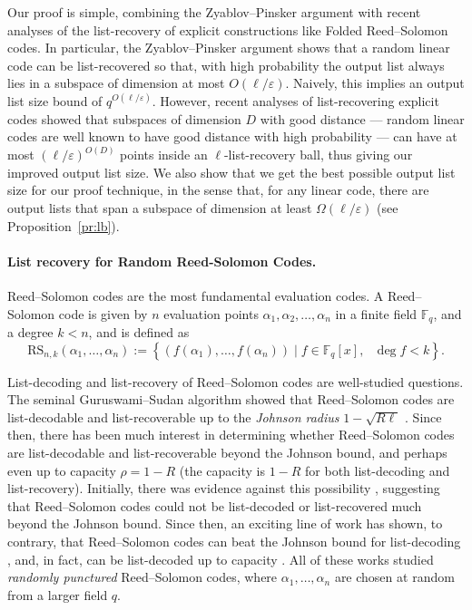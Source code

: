 \documentclass{article}
\begin{document}
Our proof is simple, combining the Zyablov--Pinsker \cite{zyablov1981list} argument with recent analyses of the list-recovery of explicit constructions like Folded Reed--Solomon codes.
In particular, the Zyablov--Pinsker argument \cite{zyablov1981list} shows that a random linear code can be list-recovered so that, with high probability the output list always lies in a subspace of dimension at most $O(\ell/\varepsilon)$.
Naively, this implies an output list size bound of $q^{O(\ell/\varepsilon)}$.
However, recent analyses of list-recovering explicit codes \cite{kopparty2018improved,tamo2023tighter} showed that subspaces of dimension $D$ with good distance --- random linear codes are well known to have good distance with high probability --- can have at most $(\ell/\varepsilon)^{O(D)}$ points inside an $\ell$-list-recovery ball, thus giving our improved output list size.
We also show that we get the best possible output list size for our proof technique, in the sense that, for any linear code, there are output lists that span a subspace of dimension at least  $\Omega(\ell/\varepsilon)$ (see Proposition~\ref{pr:lb}).

\paragraph{List recovery for Random Reed-Solomon Codes.} 
Reed--Solomon codes \cite{RS60} are the most fundamental evaluation codes. A Reed--Solomon code is given by $n$ evaluation points $\alpha_1, \alpha_2, \ldots, \alpha_n$ in a finite field $\mathbb{F}_q$, and a degree $k<n$, and is defined as
\[
\text{RS}_{n,k}(\alpha_1, \ldots, \alpha_n) := \left \lbrace \left( f(\alpha_1), \ldots, f(\alpha_n) \right) \mid f\in \mathbb{F}_q[x],\text{ }\deg f < k \right \rbrace.
\]	

List-decoding and list-recovery of Reed--Solomon codes are well-studied questions.
The seminal Guruswami--Sudan \cite{guruswami1999improved} algorithm showed that Reed--Solomon codes are list-decodable and list-recoverable up to the \emph{Johnson radius} $1-\sqrt{R\ell}$ \cite{johnson1962new, guruswami2001extensions}.
Since then, there has been much interest in determining whether Reed--Solomon codes are list-decodable and list-recoverable beyond the Johnson bound, and perhaps even up to capacity $\rho=1-R$ (the capacity is $1-R$ for both list-decoding and list-recovery).
Initially, there was evidence against this possibility \cite{guruswami2006limits,cheng2007list,ben-sasson2010subspace}, suggesting that Reed--Solomon codes could not be list-decoded or list-recovered much beyond the Johnson bound.
Since then, an exciting line of work has shown, to contrary, that Reed--Solomon codes can beat the Johnson bound for list-decoding \cite{rudra2014every,shangguan2020combinatorial, ferber2022listdecodability,goldberg2022singletontype,guo2022improved, brakensiek2023generic, guo2023randomly, AGL24}, and, in fact, can be list-decoded up to capacity \cite{brakensiek2023generic, guo2023randomly, AGL24}. All of these works studied \emph{randomly punctured} Reed--Solomon codes, where $\alpha_1,\dots,\alpha_n$ are chosen at random from a larger field $q$.
\end{document}
